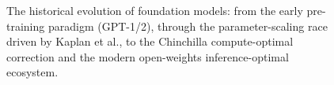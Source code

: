 \documentclass[../../main.tex]{subfiles}
\begin{document}
\begin{figure}[htbp]
{%
}
\caption{The historical evolution of foundation models: from the early pre-training paradigm (GPT-1/2), through the parameter-scaling race driven by Kaplan et al., to the Chinchilla compute-optimal correction and the modern open-weights inference-optimal ecosystem.}
\label{fig:llm_history_evolution_timeline}
\end{figure}
\end{document}
